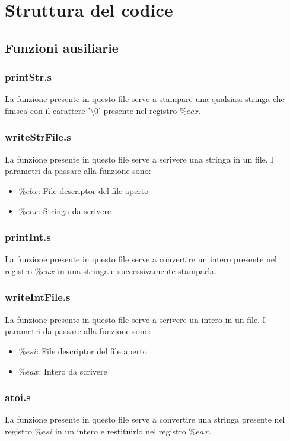 \documentclass[a4paper]{article}
\begin{document}


\tableofcontents
\pagebreak

\section{Struttura del codice}
\subsection{Funzioni ausiliarie}
\subsubsection{printStr.s}
La funzione presente in questo file serve a stampare una qualsiasi stringa che finisca
con il carattere '\( \setminus 0\)'  presente nel registro \( \%ecx \).

\subsubsection{writeStrFile.s}
La funzione presente in questo file serve a scrivere una stringa in un file. I parametri
da passare alla funzione sono:
\begin{itemize}
	\item \( \%ebx \): File descriptor del file aperto
	\item \( \%ecx \): Stringa da scrivere
\end{itemize}

\subsubsection{printInt.s}
La funzione presente in questo file serve a convertire un intero presente nel registro
\( \%eax \)  in una stringa e successivamente stamparla.

\subsubsection{writeIntFile.s}
La funzione presente in questo file serve a scrivere un intero in un file. I parametri
da passare alla funzione sono:
\begin{itemize}
	\item \( \%esi \): File descriptor del file aperto
	\item \( \%eax \): Intero da scrivere
\end{itemize}

\subsubsection{atoi.s}
La funzione presente in questo file serve a convertire una stringa presente nel registro
\( \%esi \) in un intero e restituirlo nel registro \( \%eax \).
\end{document}
